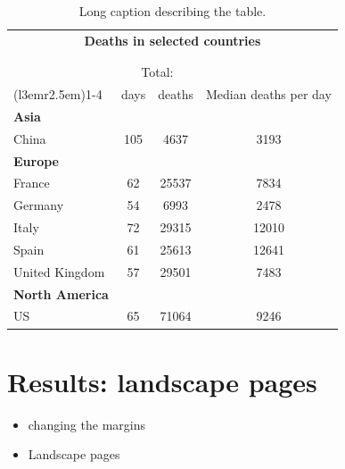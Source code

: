 \documentclass[12pt,]{book}
\providecommand{\tightlist}{%
  \setlength{\itemsep}{0pt}\setlength{\parskip}{0pt}}
\begin{document}
\begin{table}[ht]
\centering
\begingroup\fontsize{12pt}{12pt}\selectfont
\begin{tabular}{lccc}
  \toprule
  \multicolumn{4}{c}{\textbf{Deaths in selected countries}} \\
                           & & & \\ 
                           & & & \\ 
                           & \multicolumn{2}{c}{Total:} & \\
                           \cmidrule[0.02em](l{3em}r{2.5em}){1-4}
                           & days & deaths & Median deaths per day \\ \midrule
\textbf{Asia } &  &  &  \\ 
  \vspace{.4cm} \hspace{.2cm} China & 105 & 4637 & 3193 \\ 
  \textbf{Europe } &  &  &  \\ 
  \hspace{.2cm} France & 62 & 25537 & 7834 \\ 
  \hspace{.2cm} Germany & 54 & 6993 & 2478 \\ 
  \hspace{.2cm} Italy & 72 & 29315 & 12010 \\ 
  \hspace{.2cm} Spain & 61 & 25613 & 12641 \\ 
  \vspace{.4cm} \hspace{.2cm} United Kingdom & 57 & 29501 & 7483 \\ 
  \textbf{North America } &  &  &  \\ 
  \hspace{.2cm} US & 65 & 71064 & 9246 \\ 
   \bottomrule
\end{tabular}
\endgroup
\caption[xtable with row headings: short caption for LoT]{\label{tab:table1xtable3} Long caption describing the table.} 
\end{table}

\hypertarget{chapter6}{%
\chapter{Results: landscape pages}\label{chapter6}}

\begin{itemize}
\tightlist
\item
  changing the margins
\item
  Landscape pages
\end{itemize}
\end{document}
